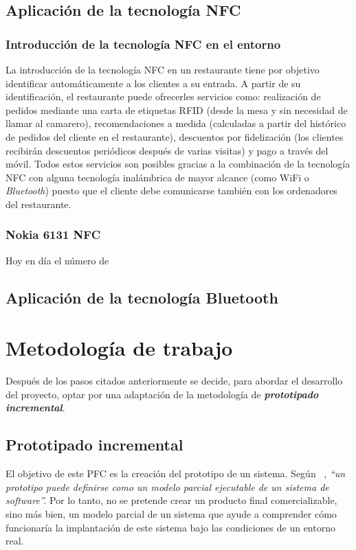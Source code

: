   \subsection{Aplicación de la tecnología \acs{NFC}}
    \subsubsection{Introducción de la tecnología \acs{NFC} en el entorno}
  La introducción de la tecnología \acs{NFC} en un restaurante tiene por
  objetivo identificar automáticamente a los clientes a su entrada. A partir de
  su identificación, el restaurante puede ofrecerles servicios como:
  realización de pedidos mediante una carta de etiquetas \acs{RFID} (desde la
  mesa y sin necesidad de llamar al camarero), recomendaciones a medida
  (calculadas a partir del histórico de pedidos del cliente en el restaurante),
  descuentos por fidelización (los clientes recibirán descuentos periódicos
  después   de varias visitas) y pago a través del móvil. Todos estos servicios
  son posibles gracias a la combinación de la tecnología \acs{NFC} con alguna
  tecnología inalámbrica de mayor alcance (como \acs{WiFi} o \emph{Bluetooth})
  puesto que el cliente debe comunicarse también con los ordenadores del
  restaurante.
  
    \subsubsection{Nokia 6131 \acs{NFC}}
  Hoy en día el número de

  \subsection{Aplicación de la tecnología Bluetooth}

\section{Metodología de trabajo}
\label{sec:workingMethodology}
Después de los pasos citados anteriormente se decide, para abordar el
desarrollo del proyecto, optar por una adaptación de la metodología de 
\emph{\textbf{prototipado incremental}}.

  \subsection{Prototipado incremental}
El objetivo de este \acs{PFC} es la creación del prototipo de un sistema.
Según ~\cite{bib:software_engineering}, \emph{``un prototipo puede definirse
como  un modelo parcial ejecutable de un sistema de software''.} Por lo tanto, 
no se pretende crear un producto final comercializable, sino más bien, un
modelo parcial de un sistema que ayude a comprender cómo funcionaría la
implantación de este sistema bajo las condiciones de un entorno real.

